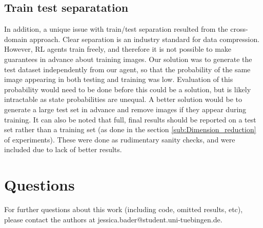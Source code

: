 \subsection{Train test separatation}
In addition, a unique issue with train/test separation resulted from the
cross-domain approach. Clear separation is an industry standard for data
compression. However, RL agents train freely, and therefore it is not
possible to make guarantees in advance about training images. Our solution was to generate the test dataset independently from our agent,
so that the probability of the same image appearing in both testing and training
was low. Evaluation of this probability would need to be done before this could
be a solution, but is likely intractable as state probabilities are unequal. A
better solution would be to generate a large test set in advance and remove
images if they appear during training. It can also be noted that full, final
results should be reported on a test set rather than a training set (as done in
the section \ref{sub:Dimension_reduction} of experiments). These were done as rudimentary
sanity checks, and were included due to lack of better results.
\section{Questions}
For further questions about this work (including code, omitted results, etc), please contact the authors at jessica.bader@student.uni-tuebingen.de.